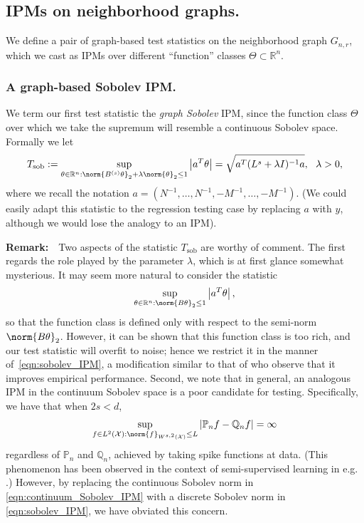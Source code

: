 \documentclass{article}
\newcommand{\Reals}{\mathbb{R}}
\newcommand{\abs}[1]{\left \lvert #1 \right \rvert}
\newcommand{\1}{\mathbf{1}}
\theoremstyle{alden}
\theoremstyle{aldenthm}
\theoremstyle{definition}
\theoremstyle{remark}
\begin{document}
\subsection{IPMs on neighborhood graphs.}
\label{sec:neighborhood_graph_IPMs}

We define a pair of graph-based test statistics on the neighborhood graph $G_{n,r}$, which we cast as IPMs over different ``function'' classes $\Theta \subset \Reals^n$. 

\subsubsection{A graph-based Sobolev IPM.}

We term our first test statistic the \emph{graph Sobolev} IPM, since the function class $\Theta$ over which we take the supremum will resemble a continuous Sobolev space. Formally we let
\begin{equation}
\label{eqn:sobolev_IPM}
T_{\textrm{sob}} := \sup_{\theta \in \Reals^n: \norm{B^{(s)}\theta}_2 + \lambda\norm{\theta}_2 \leq 1} \abs{a^T \theta} = \sqrt{a^T (L^s + \lambda I)^{-1}a}, ~~ \lambda > 0, 
\end{equation}
where we recall the notation $a = \left(N^{-1},\ldots,N^{-1},-M^{-1},\ldots,-M^{-1}\right)$. (We could easily adapt this statistic to the regression testing case by replacing $a$ with $y$, although we would lose the analogy to an IPM). 

\textbf{Remark:}~~Two aspects of the statistic $T_{\textrm{sob}}$ are worthy of comment. The first regards the role played by the parameter $\lambda$, which is at first glance somewhat mysterious. It may seem more natural to consider the statistic
\begin{equation*}
\sup_{\theta \in \Reals^n: \norm{B\theta}_2 \leq 1} \abs{a^T \theta}, 
\end{equation*}
so that the function class is defined only with respect to the semi-norm $\norm{B\theta}_2$. However, it can be shown that this function class is too rich, and our test statistic will overfit to noise; hence we restrict it in the manner of~\eqref{eqn:sobolev_IPM}, a modification similar to that of \citet{arbel18} who observe that it improves empirical performance. Second, we note that in general, an analogous IPM in the continuum Sobolev space is a poor candidate for testing. Specifically, we have that when $2s < d$,
\begin{equation}
\label{eqn:continuum_Sobolev_IPM}
\sup_{f \in L^2(\mathcal{X}): \norm{f}_{W^{s,2}(\mathcal{X})} \leq L} \abs{\mathbb{P}_nf - \mathbb{Q}_nf} = \infty
\end{equation}
regardless of $\mathbb{P}_n$ and $\mathbb{Q}_n$, achieved by taking spike functions at data. (This phenomenon has been observed in the context of semi-supervised learning in e.g. \citet{nadler09,zhou11,slepcev17,alaoui16}.) However, by replacing the continuous Sobolev norm in \eqref{eqn:continuum_Sobolev_IPM} with a discrete Sobolev norm in \eqref{eqn:sobolev_IPM}, we have obviated this concern.  
\end{document}
